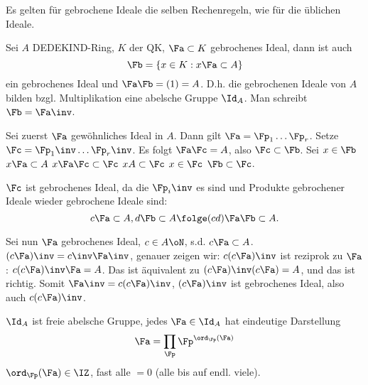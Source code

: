 \begin{Bemerkung}
 Es gelten für gebrochene Ideale die selben Rechenregeln, wie für die üblichen Ideale.
\end{Bemerkung}

\begin{Fakt}
 Sei $A$ DEDEKIND-Ring, $K$ der QK, $\Fa\subset K$ gebrochenes Ideal, dann ist auch
 \[ \Fb=\{x\in K: x\Fa\subset A \}\]
 ein gebrochenes Ideal und $\Fa\Fb=(1)=A$. D.h. die gebrochenen Ideale von $A$ bilden bzgl. Multiplikation eine abelsche Gruppe $\Id_A$. Man schreibt $\Fb=\Fa\inv$.
\end{Fakt}

\begin{Beweis}
 Sei zuerst $\Fa$ gewöhnliches Ideal in $A$. Dann gilt $\Fa=\Fp_1\ldots\Fp_r$. Setze $\Fc=\Fp_1\inv\ldots\Fp_r\inv$. Es folgt $\Fa\Fc=A$, also $\Fc\subset\Fb$. Sei $x\in\Fb$ \folge $x\Fa\subset A$ \folge $x\Fa\Fc\subset \Fc$ \folge $xA\subset \Fc$ \folge $x\in \Fc$ \folge $\Fb\subset\Fc$.
 
 $\Fc$ ist gebrochenes Ideal, da die $\Fp_i\inv$ es sind und Produkte gebrochener Ideale wieder gebrochene Ideale sind:
 \[ c\Fa\subset A, d\Fb\subset A \folge (cd)\Fa\Fb\subset A.\]
 
 Sei nun $\Fa$ gebrochenes Ideal, $c\in A\oN$, s.d. $c\Fa\subset A$. $(c\Fa)\inv=c\inv\Fa\inv$, genauer zeigen wir: $c(c\Fa)\inv$ ist reziprok zu $\Fa$: $c(c\Fa)\inv\Fa=A$. Das ist äquivalent zu $(c\Fa)\inv(c\Fa)=A$, und das ist richtig. Somit $\Fa\inv=c(c\Fa)\inv$, $(c\Fa)\inv$ ist gebrochenes Ideal, also auch $c(c\Fa)\inv$.
\end{Beweis}

\begin{Folgerung}
 $\Id_A$ ist freie abelsche Gruppe, jedes $\Fa\in\Id_A$ hat eindeutige Darstellung \[\Fa=\prod_{\Fp}\Fp^{\ord_{\Fp}(\Fa)}\]
 $\ord_{\Fp}(\Fa)\in \IZ$, fast alle $=0$ (alle bis auf endl. viele).
\end{Folgerung}
